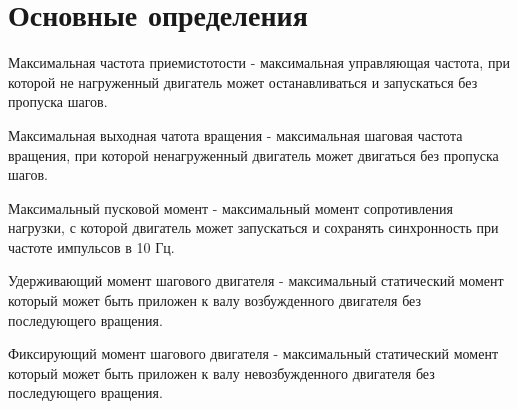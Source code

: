 \newpage
\section{ Основные определения }

Максимальная частота приемистотости - максимальная управляющая частота, при которой не нагруженный
двигатель может останавливаться и запускаться без пропуска шагов.

Максимальная выходная чатота вращения - максимальная шаговая частота вращения, при которой
ненагруженный двигатель может двигаться без пропуска шагов.

Максимальный пусковой момент - максимальный момент сопротивления нагрузки, с которой двигатель может
запускаться и сохранять синхронность при частоте импульсов в 10 Гц.

Удерживающий момент шагового двигателя - максимальный статический момент который может быть приложен
к валу возбужденного двигателя без последующего вращения. 

Фиксирующий момент шагового двигателя - максимальный статический момент который может быть приложен
к валу невозбужденного двигателя без последующего вращения. 

